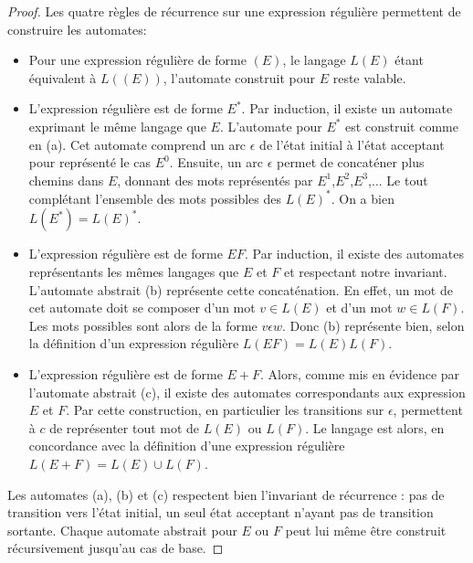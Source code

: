 \begin{proof}
	Les quatre règles de récurrence sur une expression régulière permettent de construire les automates:
	\begin{itemize}
		\item Pour une expression régulière de forme $(E)$, le langage $L(E)$ étant équivalent à $L((E))$, l'automate construit pour $E$ reste valable.
		\item L'expression régulière est de forme $E^*$. Par induction, il existe un automate exprimant le même langage que $E$. L'automate pour $E^*$ est construit comme en (a). Cet automate comprend un arc $\epsilon$ de l'état initial à l'état acceptant pour représenté le cas $E^0$. Ensuite, un arc $\epsilon$ permet de concaténer plus chemins dans $E$, donnant des mots représentés par $E^1$,$E^2$,$E^3$,... Le tout complétant l'ensemble des mots possibles des $L(E)^*$. On a bien $L(E^*)=L(E)^*$.
		\item L'expression régulière est de forme $EF$. Par induction, il existe des automates représentants les mêmes langages que $E$ et $F$ et respectant notre invariant. L'automate abstrait (b) représente cette concaténation. En effet, un mot de cet automate doit se composer d'un mot $v\in L(E)$ et d'un mot $w \in L(F)$. Les mots possibles sont alors de la forme $v\epsilon w$. Donc (b) représente bien, selon la définition d'un expression régulière $L(EF)=L(E)L(F)$.
		\item L'expression régulière est de forme $E+F$. Alors, comme mis en évidence par l'automate abstrait (c), il existe des automates correspondants aux expression $E$ et $F$. Par cette construction, en particulier les transitions sur $\epsilon$, permettent à $c$ de représenter tout mot de $L(E)$ ou $L(F)$. Le langage est alors, en concordance avec la définition d'une expression régulière $L(E+F)=L(E)\cup L(F)$.
	\end{itemize}
	
	Les automates (a), (b) et (c) respectent bien l'invariant de récurrence : pas de transition vers l'état initial, un seul état acceptant n'ayant pas de transition sortante. Chaque automate abstrait pour $E$ ou $F$ peut lui même être construit récursivement jusqu'au cas de base.
	
\end{proof}

